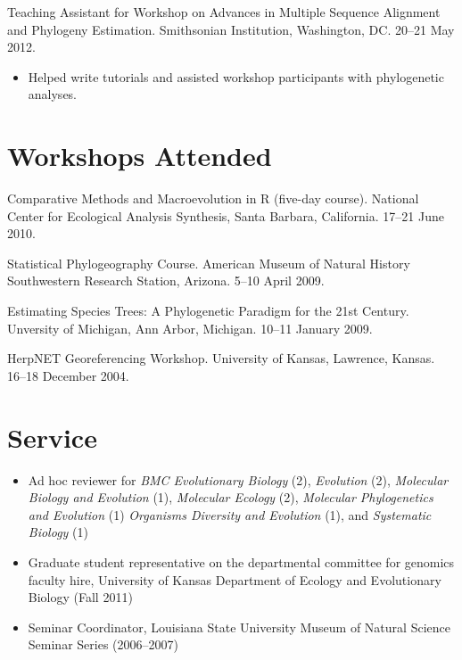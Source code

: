 \documentclass[10pt]{article}
\newenvironment{myItemize}{
  \begin{itemize}
    \setlength{\leftskip}{-4mm}
    \setlength{\itemsep}{0.25em}
    \setlength{\parskip}{0pt}
    \setlength{\parsep}{0.5em}}
  {\end{itemize}}
\newcommand{\myHangIndent}{\hangindent=5mm}
\newcommand{\myIndent}{\hspace{5mm}}
\begin{document}
\myHangIndent
Teaching Assistant for Workshop on Advances in Multiple Sequence Alignment and
Phylogeny Estimation.
Smithsonian Institution, Washington, DC.
20--21 May 2012. \\
\begin{itemize}
    \setlength{\leftskip}{0em}
    \setlength{\itemsep}{0.25em}
    \setlength{\parskip}{-1em}
    \setlength{\parsep}{0.5em}
    \item Helped write tutorials and assisted workshop participants with
        phylogenetic analyses.
\end{itemize}

\section*{Workshops Attended}
\myHangIndent
Comparative Methods and Macroevolution in R (five-day course).
National Center for Ecological Analysis Synthesis, Santa Barbara, California.
17--21 June 2010.

\myHangIndent
Statistical Phylogeography Course.
American Museum of Natural History Southwestern Research Station, Arizona.
5--10 April 2009.

\myHangIndent
Estimating Species Trees: A Phylogenetic Paradigm for the 21st Century.
Unversity of Michigan, Ann Arbor, Michigan.
10--11 January 2009.

\myHangIndent
HerpNET Georeferencing Workshop.
University of Kansas, Lawrence, Kansas.
16--18 December 2004.

\section*{Service}
\begin{myItemize}
\item Ad hoc reviewer for
    \emph{BMC Evolutionary Biology} (2),
    \emph{Evolution} (2),
    \emph{Molecular Biology and Evolution} (1),
    \emph{Molecular Ecology} (2),
    \emph{Molecular Phylogenetics and Evolution} (1)
    \emph{Organisms Diversity and Evolution} (1), and
    \emph{Systematic Biology} (1)
\item Graduate student representative on the departmental committee for
    genomics faculty hire, University of Kansas Department of Ecology and
    Evolutionary Biology (Fall 2011)
\item Seminar Coordinator, Louisiana State University Museum of Natural Science
    Seminar Series (2006--2007)
\end{myItemize}
\end{document}

